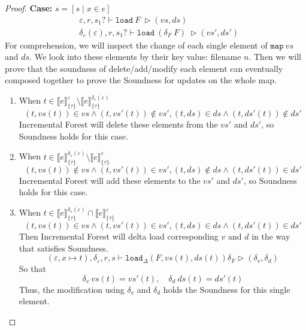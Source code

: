 \documentclass[10pt,twoside,a4paper]{article}
\theoremstyle{theorem}
\theoremstyle{lemma}
\theoremstyle{property}
\theoremstyle{definition}
\theoremstyle{assumption}
\def\newenv{\delta_\varepsilon(\varepsilon)}
\begin{document}
\begin{proof}
	\textbf{Case: } $s = [ s \mid x \in e]$\\
	\begin{align*}
		& \varepsilon, r, s_1? \vdash \mathtt{load}~ F~ \rhd (vs, ds)\\
		& \newenv, r, s_1? \vdash \mathtt{load}~ (\delta_F~F)~ \rhd (vs', ds')
	\end{align*}
	For comprehension, we will inspect the change of each single element of $\mathtt{map} ~vs$ and $ds$. We look into these elements by their key value: filename $n$. Then we will prove that the soundness of delete/add/modify each element can eventually composed together to prove the Soundness for updates on the whole map.
	\begin{enumerate}
	\item
	When $ t \in \llbracket e \rrbracket^{\varepsilon}_{\{\tau\}} \setminus \llbracket e \rrbracket^{\newenv}_{\{\tau\}}$
	\begin{displaymath}
		(t, vs(t)) \in vs \wedge (t, vs'(t)) \notin vs', (t, ds) \in ds \wedge (t, ds'(t)) \notin ds'
	\end{displaymath}
	Incremental Forest will delete these elements from the $vs'$ and $ds'$, so Soundness holds for this case.


	\item
	When $ t \in \llbracket e \rrbracket^{\newenv}_{\{\tau\}} \setminus \llbracket e \rrbracket^{\varepsilon}_{\{\tau\}}$
	\begin{displaymath}
		(t, vs(t)) \notin vs \wedge (t, vs'(t)) \in vs', (t, ds) \notin ds \wedge (t, ds'(t)) \in ds'
	\end{displaymath}
	Incremental Forest will add these elements to the $vs'$ and $ds'$, so Soundness holds for this case.


	\item
	When $ t \in \llbracket e \rrbracket^{\newenv}_{\{\tau\}} \cap \llbracket e \rrbracket^{\varepsilon}_{\{\tau\}}$
	\begin{displaymath}
		(t, vs(t)) \in vs \wedge (t, vs'(t)) \in vs', (t, ds) \in ds \wedge (t, ds'(t)) \in ds'
	\end{displaymath}
	Then Incremental Forest will delta load corresponding $v$ and $d$ in the way that satisfies Soundness.
	\begin{displaymath}
		(\varepsilon, x \mapsto t),\delta_\varepsilon, r, s \vdash \mathtt{load}_\Delta(F, vs(t), ds(t)) \delta_F \rhd (\delta_v, \delta_d)
	\end{displaymath}
	So that
	\begin{displaymath}
		\delta_v ~vs(t) = vs'(t), \quad \delta_d ~ds(t) = ds'(t)
	\end{displaymath}
	Thus, the modification using $\delta_v$ and $\delta_d$ holds the Soundness for this single element.


\end{enumerate}
\end{proof}
\end{document}
